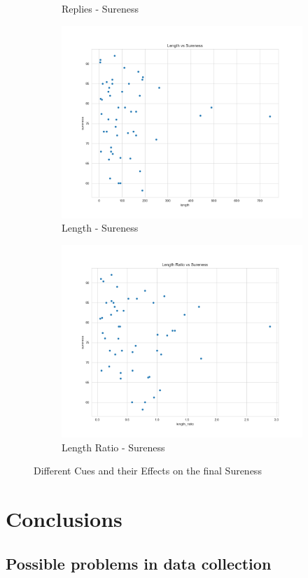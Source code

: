 \documentclass[11pt, oneside]{article}   	%
\begin{document}
\begin{figure}[H]
\begin{subfigure}{.5\textwidth}
  \caption{Replies - Sureness}
\end{subfigure}
\begin{subfigure}{.5\textwidth}
  \centering
  \includegraphics[width=\linewidth]{../plots/full_data/length_vs_sureness}
  \caption{Length - Sureness}
\end{subfigure}%
\begin{subfigure}{.5\textwidth}
  \centering
  \includegraphics[width=\linewidth]{../plots/full_data/length_ratio_vs_sureness}
  \caption{Length Ratio - Sureness}
\end{subfigure}
\caption{Different Cues and their Effects on the final Sureness}
\end{figure}

\section{Conclusions}
\subsection{Possible problems in data collection}
\end{document}
